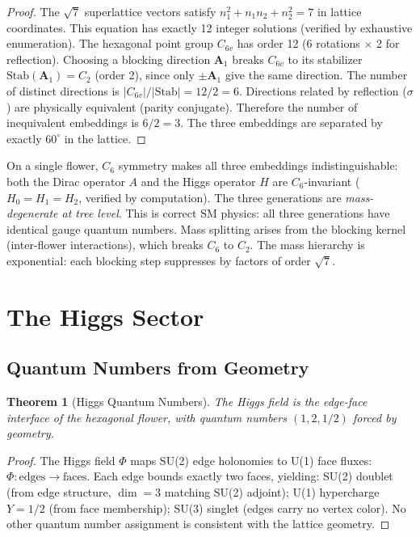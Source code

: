 \documentclass[12pt,a4paper]{article}
\theoremstyle{plain}
\newtheorem{theorem}{Theorem}[section]
\theoremstyle{definition}
\begin{document}
\begin{proof}
The $\sqrt{7}$ superlattice vectors satisfy $n_1^2 + n_1 n_2 + n_2^2 = 7$ in lattice coordinates. This equation has exactly 12 integer solutions (verified by exhaustive enumeration). The hexagonal point group $C_{6v}$ has order 12 (6 rotations $\times$ 2 for reflection). Choosing a blocking direction $\mathbf{A}_1$ breaks $C_{6v}$ to its stabilizer $\mathrm{Stab}(\mathbf{A}_1) = C_2$ (order 2), since only $\pm\mathbf{A}_1$ give the same direction. The number of distinct directions is $|C_{6v}|/|\mathrm{Stab}| = 12/2 = 6$. Directions related by reflection ($\sigma$) are physically equivalent (parity conjugate). Therefore the number of inequivalent embeddings is $6/2 = 3$. The three embeddings are separated by exactly $60^\circ$ in the lattice. \qedhere
\end{proof}

On a single flower, $C_6$ symmetry makes all three embeddings indistinguishable: both the Dirac operator $A$ and the Higgs operator $H$ are $C_6$-invariant ($H_0 = H_1 = H_2$, verified by computation). The three generations are \emph{mass-degenerate at tree level}. This is correct SM physics: all three generations have identical gauge quantum numbers. Mass splitting arises from the blocking kernel (inter-flower interactions), which breaks $C_6$ to $C_2$. The mass hierarchy is exponential: each blocking step suppresses by factors of order $\sqrt{7}$.

\section{The Higgs Sector}\label{sec:higgs}

\subsection{Quantum Numbers from Geometry}

\begin{theorem}[Higgs Quantum Numbers]\label{thm:higgs-qn}
The Higgs field is the edge-face interface of the hexagonal flower, with quantum numbers $(1, 2, 1/2)$ forced by geometry.
\end{theorem}

\begin{proof}
The Higgs field $\Phi$ maps SU(2) edge holonomies to U(1) face fluxes: $\Phi\colon \text{edges} \to \text{faces}$. Each edge bounds exactly two faces, yielding: SU(2) doublet (from edge structure, $\dim = 3$ matching SU(2) adjoint); U(1) hypercharge $Y = 1/2$ (from face membership); SU(3) singlet (edges carry no vertex color). No other quantum number assignment is consistent with the lattice geometry. \qedhere
\end{proof}
\end{document}
